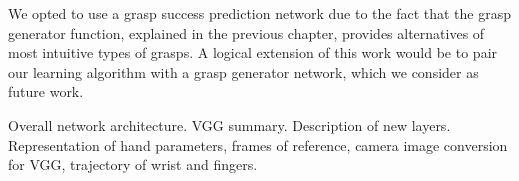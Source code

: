 We opted to use a grasp success prediction network due to the fact that the grasp generator function, explained in the previous chapter, provides alternatives of most intuitive types of grasps. A logical extension of this work would be to pair our learning algorithm with a grasp generator network, which we consider as future work.

Overall network architecture. VGG summary. Description of new layers. Representation of hand parameters, frames of reference, camera image conversion for VGG, trajectory of wrist and fingers.